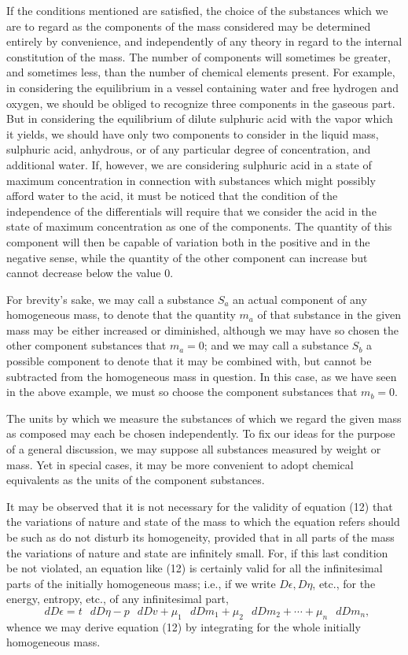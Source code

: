 \documentclass[11pt]{article}
\newcommand{\dd}{\mathop{}\!d}
\newcommand{\eps}{\epsilon}
\begin{document}
If the conditions mentioned are satisfied, the choice of the substances which we are to regard as the components of the mass considered may be determined entirely by convenience, and independently of any theory in regard to the internal constitution of the mass. The number of components will sometimes be greater, and sometimes less, than the number of chemical elements present. For example, in considering the equilibrium in a vessel containing water and free hydrogen and oxygen, we should be obliged to recognize three components in the gaseous part. But in considering the equilibrium of dilute sulphuric acid with the vapor which it yields, we should have only two components to consider in the liquid mass, sulphuric acid, anhydrous, or of any particular degree of concentration, and additional water. If, however, we are considering sulphuric acid in a state of maximum concentration in connection with substances which might possibly afford water to the acid, it must be noticed that the condition of the independence of the differentials will require that we consider the acid in the state of maximum concentration as one of the components. The quantity of this component will then be capable of variation both in the positive and in the negative sense, while the quantity of the other component can increase but cannot decrease below the value 0.

For brevity's sake, we may call a substance \(S_a\) an actual component of any homogeneous mass, to denote that the quantity \(m_a\) of that substance in the given mass may be either increased or diminished, although we may have so chosen the other component substances that \(m_a=0\); and we may call a substance \(S_b\) a possible component to denote that it may be combined with, but cannot be subtracted from the homogeneous mass in question. In this case, as we have seen in the above example, we must so choose the component substances that \(m_b=0\).

The units by which we measure the substances of which we regard the given mass as composed may each be chosen independently. To fix our ideas for the purpose of a general discussion, we may suppose all substances measured by weight or mass. Yet in special cases, it may be more convenient to adopt chemical equivalents as the units of the component substances.

It may be observed that it is not necessary for the validity of equation (12) that the variations of nature and state of the mass to which the equation refers should be such as do not disturb its homogeneity, provided that in all parts of the mass the variations of nature and state are infinitely small. For, if this last condition be not violated, an equation like (12) is certainly valid for all the infinitesimal parts of the initially homogeneous mass; i.e., if we write \(D\eps,D\eta\), etc., for the energy, entropy, etc., of any infinitesimal part,
\begin{equation}
\dd D\eps
= t\,\dd D\eta - p\,\dd Dv
  + \mu_1\,\dd Dm_1 + \mu_2\,\dd Dm_2 + \cdots + \mu_n\,\dd Dm_n,
\end{equation}
whence we may derive equation (12) by integrating for the whole initially homogeneous mass.
\end{document}
